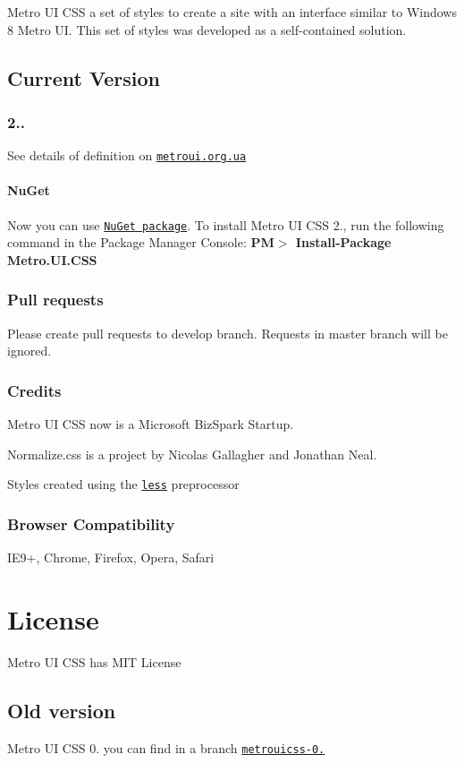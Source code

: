 Metro U\-I C\-S\-S a set of styles to create a site with an interface similar to Windows 8 Metro U\-I. This set of styles was developed as a self-\/contained solution.

\subsection*{Current Version}

\subsubsection*{2..}

See details of definition on \href{http://metroui.org.ua}{\tt metroui.\-org.\-ua}

\paragraph*{Nu\-Get}

Now you can use \href{https://www.nuget.org/packages/Metro.UI.CSS/}{\tt Nu\-Get package}. To install Metro U\-I C\-S\-S 2., run the following command in the Package Manager Console\-: {\bfseries P\-M$>$ Install-\/\-Package Metro.\-U\-I.\-C\-S\-S}

\subsubsection*{Pull requests}

Please create pull requests to develop branch. Requests in master branch will be ignored.

\subsubsection*{Credits}


\begin{DoxyItemize}
\item Metro U\-I C\-S\-S now is a Microsoft Biz\-Spark Startup.
\item Normalize.\-css is a project by Nicolas Gallagher and Jonathan Neal.
\item Styles created using the \href{http://lesscss.org}{\tt less} preprocessor
\end{DoxyItemize}

\subsubsection*{Browser Compatibility}

I\-E9+, Chrome, Firefox, Opera, Safari

\section*{License}

Metro U\-I C\-S\-S has M\-I\-T License

\subsection*{Old version}

Metro U\-I C\-S\-S 0. you can find in a branch \href{https://github.com/olton/Metro-UI-CSS/tree/metrouicss-0.95}{\tt metrouicss-\/0.} 